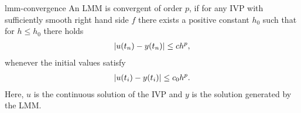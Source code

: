 \begin{Definition}{lmm-convergence}
An LMM is convergent of order $p$, if for any IVP with sufficiently
smooth right hand side $f$ there exists a positive constant $h_0$ such
that for $h\le h_0$ there holds
\begin{gather}
  \label{eq:lmm-convergence:1}
  \lvert u(t_n) - y(t_n)\rvert \le c h^p,
\end{gather}
whenever the initial values satisfy
\begin{gather}
  \label{eq:lmm-convergence:2}
  \lvert u(t_i) - y(t_i)\rvert \le c_0 h^p.
\end{gather}
Here, $u$ is the continuous solution of the IVP and $y$ is the
solution generated by the LMM.
\end{Definition}


